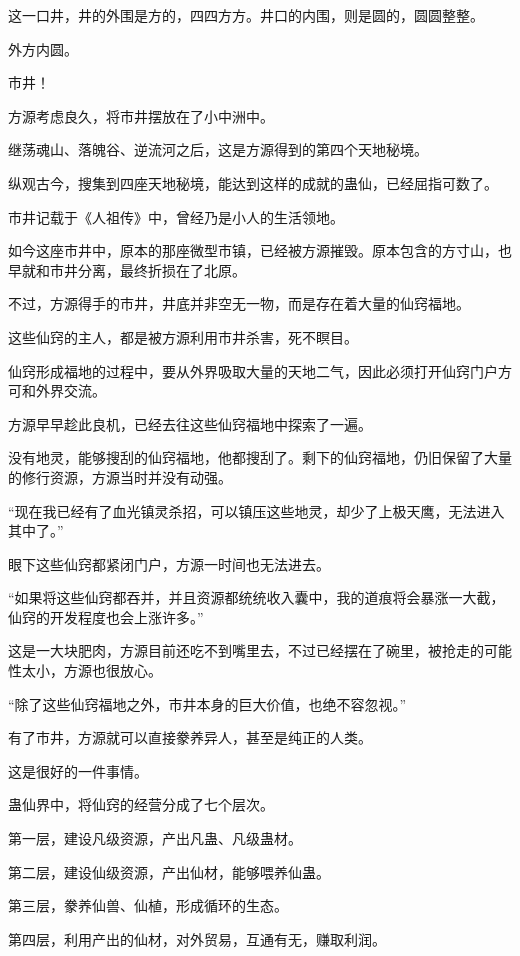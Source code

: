 
\begin{this_body}

这一口井，井的外围是方的，四四方方。井口的内围，则是圆的，圆圆整整。

外方内圆。

市井！

方源考虑良久，将市井摆放在了小中洲中。

继荡魂山、落魄谷、逆流河之后，这是方源得到的第四个天地秘境。

纵观古今，搜集到四座天地秘境，能达到这样的成就的蛊仙，已经屈指可数了。

市井记载于《人祖传》中，曾经乃是小人的生活领地。

如今这座市井中，原本的那座微型市镇，已经被方源摧毁。原本包含的方寸山，也早就和市井分离，最终折损在了北原。

不过，方源得手的市井，井底并非空无一物，而是存在着大量的仙窍福地。

这些仙窍的主人，都是被方源利用市井杀害，死不瞑目。

仙窍形成福地的过程中，要从外界吸取大量的天地二气，因此必须打开仙窍门户方可和外界交流。

方源早早趁此良机，已经去往这些仙窍福地中探索了一遍。

没有地灵，能够搜刮的仙窍福地，他都搜刮了。剩下的仙窍福地，仍旧保留了大量的修行资源，方源当时并没有动强。

“现在我已经有了血光镇灵杀招，可以镇压这些地灵，却少了上极天鹰，无法进入其中了。”

眼下这些仙窍都紧闭门户，方源一时间也无法进去。

“如果将这些仙窍都吞并，并且资源都统统收入囊中，我的道痕将会暴涨一大截，仙窍的开发程度也会上涨许多。”

这是一大块肥肉，方源目前还吃不到嘴里去，不过已经摆在了碗里，被抢走的可能性太小，方源也很放心。

“除了这些仙窍福地之外，市井本身的巨大价值，也绝不容忽视。”

有了市井，方源就可以直接豢养异人，甚至是纯正的人类。

这是很好的一件事情。

蛊仙界中，将仙窍的经营分成了七个层次。

第一层，建设凡级资源，产出凡蛊、凡级蛊材。

第二层，建设仙级资源，产出仙材，能够喂养仙蛊。

第三层，豢养仙兽、仙植，形成循环的生态。

第四层，利用产出的仙材，对外贸易，互通有无，赚取利润。


\end{this_body}
